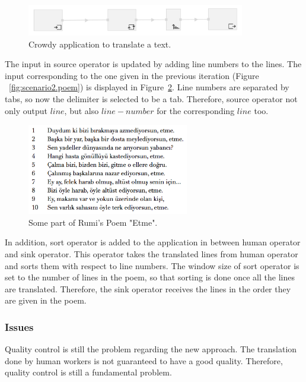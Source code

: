 \begin{figure}[ht]
	\centering
	\includegraphics[width=0.85\textwidth]{figures/scenarios/scenario2_1.png}
	\caption{Crowdy application to translate a text.}
	\label{fig:scenario2.1}
\end{figure}

The input in source operator is updated by adding line numbers to the lines. The input corresponding to the one given in the previous iteration (Figure ~\ref{fig:scenario2.poem}) is displayed in Figure~\ref{fig:scenario2.poem2}. Line numbers are separated by tabs, so now the delimiter is selected to be a tab. Therefore, source operator not only output $line$, but also $line-number$ for the corresponding $line$ too.

\begin{figure}[ht]
	\centering
	\includegraphics[height=150px]{figures/scenarios/poem2.png}
	\caption{Some part of Rumi's Poem "Etme".}
	\label{fig:scenario2.poem2}
\end{figure}

In addition, sort operator is added to the application in between human operator and sink operator. This operator takes the translated lines from human operator and sorts them with respect to line numbers. The window size of sort operator is set to the number of lines in the poem, so that sorting is done once all the lines are translated. Therefore, the sink operator receives the lines in the order they are given in the poem.

\subsubsection{Issues}
Quality control is still the problem regarding the new approach. The translation done by human workers is not guaranteed to have a good quality. Therefore, quality control is still a fundamental problem.


